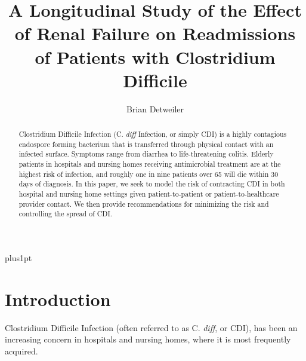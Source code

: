 \documentclass[12pt]{ociamthesis}\usepackage[]{graphicx}\usepackage[]{color}
\title{A Longitudinal Study of the Effect of Renal Failure on Readmissions of Patients with Clostridium Difficile}   %
\author{Brian Detweiler}
\begin{document}
\baselineskip=18pt plus1pt

\setcounter{secnumdepth}{3}
\setcounter{tocdepth}{3}


\maketitle                  %

 


\begin{abstract}
Clostridium Difficile Infection (C. \textit{diff} Infection, or simply CDI) 
is a highly contagious endospore forming bacterium that is transferred
through physical contact with an infected surface. Symptoms range from diarrhea to
life-threatening colitis. Elderly patients in hospitals and nursing homes receiving antimicrobial
treatment are at the highest risk of infection, and roughly one in nine patients over 65 will
die within 30 days of diagnosis. In this paper, we seek to model the risk of contracting CDI in both
hospital and nursing home settings given patient-to-patient or patient-to-healthcare provider 
contact. We then provide recommendations for minimizing the risk and controlling the spread of CDI.
\end{abstract}

\begin{romanpages}          %
\tableofcontents            %
\listoffigures              %
\end{romanpages}            %


\chapter{Introduction}

Clostridium Difficile Infection (often referred to as C. \textit{diff}, or CDI), 
has been an increasing concern in hospitals and nursing homes, where it is most frequently acquired.
\cite{Lamont2017}
\cite{Lessa2015}
\end{document}
